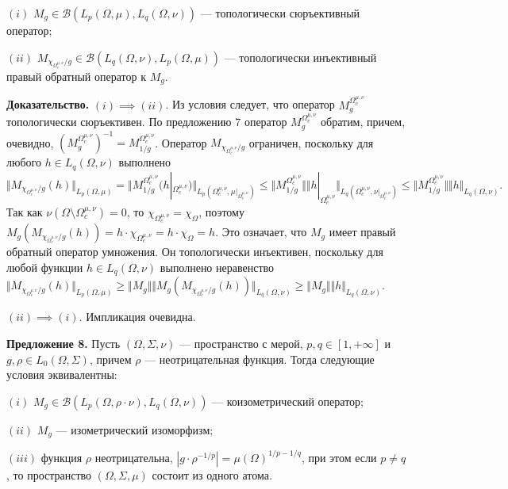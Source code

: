 \documentclass[11pt,twoside]{article}
\begin{document}
$(i)$ $M_g\in\mathcal{B}(L_p(\Omega,\mu),L_q(\Omega,\nu))$ --- топологически
сюръективный оператор;

$(ii)$ $M_{\chi_{\Omega_c^{\mu,\nu}}/g}\in\mathcal{B}(L_q(\Omega,\nu),
L_p(\Omega,\mu))$ --- топологически инъективный правый обратный оператор к
$M_g$.

\textbf{Доказательство.} $(i)$$\implies$$ (ii)$. Из условия следует, что
оператор $M_g^{\Omega_c^{\mu,\nu}}$ топологически сюръективен. По
предложению 7 оператор $M_g^{\Omega_c^{\mu,\nu}}$ обратим, причем,
очевидно,
${(M_g^{\Omega_c^{\mu,\nu}})}^{-1}=M_{1/g}^{\Omega_c^{\mu,\nu}}$.
Оператор $M_{\chi_{\Omega_c^{\mu,\nu}}/g}$ ограничен, поскольку для
любого $h\in L_q(\Omega,\nu)$ выполнено
$$
    \Vert
    M_{\chi_{\Omega_c^{\mu,\nu}}/g}(h)
    \Vert_{L_p(\Omega,\mu)}
    =\Vert
    M_{1/g}^{\Omega_c^{\mu,\nu}}(h|_{\Omega_c^{\mu,\nu}})
    \Vert_{L_p(\Omega_c^{\mu,\nu},\mu|_{\Omega_c^{\mu,\nu}})}
    \leq\Vert
    M_{1/g}^{\Omega_c^{\mu,\nu}}
    \Vert
    \Vert
    h|_{\Omega_c^{\mu,\nu}}
    \Vert_{L_q(\Omega_c^{\mu,\nu},\nu|_{\Omega_c^{\mu,\nu}})}
    \leq\Vert
    M_{1/g}^{\Omega_c^{\mu,\nu}}
    \Vert
    \Vert h\Vert_{L_q(\Omega,\nu)}.
$$
Так как $\nu(\Omega\setminus\Omega_c^{\mu,\nu})=0$, то
$\chi_{\Omega_c^{\mu,\nu}}=\chi_{\Omega}$, поэтому
$M_g(M_{\chi_{\Omega_c^{\mu,\nu}}/g}(h))
=h\cdot\chi_{\Omega_c^{\mu,\nu}}=h\cdot\chi_{\Omega}=h$. Это означает, что $M_g$
имеет правый обратный оператор умножения. Он топологически инъективен, поскольку
для любой функции $h\in L_q(\Omega,\nu)$ выполнено неравенство $\Vert
M_{\chi_{\Omega_c^{\mu,\nu}}/g}(h)\Vert_{L_p(\Omega,\mu)} \geq\Vert
M_g\Vert\Vert M_g(M_{\chi_{\Omega_c^{\mu,\nu}}/g}(h))\Vert_{L_q(\Omega,\nu)}
\geq\Vert M_g\Vert\Vert h\Vert_{L_q(\Omega,\nu)}$.

$(ii)$$\implies$$ (i)$. Импликация очевидна.

\textbf{Предложение 8.} Пусть $(\Omega,\Sigma,\nu)$ --- пространство с
мерой, $p,q\in[1,+\infty]$ и $g,\rho\in L_0(\Omega,\Sigma)$, причем $\rho$
--- неотрицательная функция. Тогда следующие условия эквивалентны:

$(i)$ $M_g\in\mathcal{B}(L_p(\Omega,\rho\cdot\nu),L_q(\Omega,\nu))$ ---
коизометрический оператор;

$(ii)$ $M_g$ --- изометрический изоморфизм;

$(iii)$ функция $\rho$ неотрицательна, $|g\cdot
\rho^{-1/p}|={\mu(\Omega)}^{1/p-1/q}$, при этом если $p\neq q$, то
пространство $(\Omega,\Sigma,\mu)$ состоит из одного атома.
\end{document}
